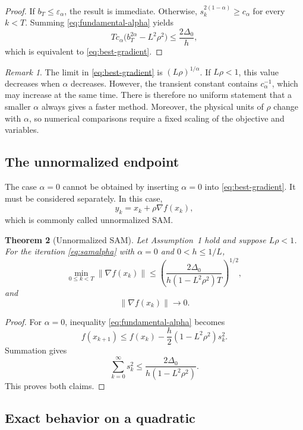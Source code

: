\documentclass[11pt]{article}
\newtheorem{theorem}{Theorem}
\theoremstyle{remark}
\newtheorem{remark}[theorem]{Remark}
\newcommand{\norm}[1]{\left\lVert #1\right\rVert}
\begin{document}
\begin{proof}
If $b_T\leq\varepsilon_\alpha$, the result is immediate.  Otherwise,
$s_k^{2(1-\alpha)}\geq c_\alpha$ for every $k<T$.
Summing \eqref{eq:fundamental-alpha} yields
$$
 Tc_\alpha\bigl(b_T^{2\alpha}-L^2\rho^2\bigr)
 \leq\frac{2\Delta_0}{h},
$$
which is equivalent to \eqref{eq:best-gradient}.
\end{proof}

\begin{remark}\label{rem:alpha-comparison}
The limit in \eqref{eq:best-gradient} is
$(L\rho)^{1/\alpha}$.  If $L\rho<1$, this value decreases when
$\alpha$ decreases.  However, the transient constant contains
$c_\alpha^{-1}$, which may increase at the same time.  There is therefore
no uniform statement that a smaller $\alpha$ always gives a faster method.
Moreover, the physical units of $\rho$ change with $\alpha$, so numerical
comparisons require a fixed scaling of the objective and variables.
\end{remark}

\subsection{The unnormalized endpoint}

The case $\alpha=0$ cannot be obtained by inserting $\alpha=0$ into
\eqref{eq:best-gradient}.  It must be considered separately.  In this case,
$$
  y_k=x_k+\rho\nabla f(x_k),
$$
which is commonly called unnormalized SAM.

\begin{theorem}[Unnormalized SAM]\label{thm:usam}
Let Assumption~1 hold and suppose $L\rho<1$.  For the iteration
\eqref{eq:samalpha} with $\alpha=0$ and $0<h\leq1/L$,
\begin{equation}\label{eq:usam-bound}
 \min_{0\leq k<T}\norm{\nabla f(x_k)}
 \leq
 \left(
 \frac{2\Delta_0}{
 h(1-L^2\rho^2)T}
 \right)^{1/2},
\end{equation}
and
$$
  \norm{\nabla f(x_k)}\longrightarrow0.
$$
\end{theorem}

\begin{proof}
For $\alpha=0$, inequality \eqref{eq:fundamental-alpha} becomes
$$
 f(x_{k+1})\leq f(x_k)
 -\frac h2(1-L^2\rho^2)s_k^2.
$$
Summation gives
$$
 \sum_{k=0}^{\infty}s_k^2
 \leq \frac{2\Delta_0}{h(1-L^2\rho^2)}.
$$
This proves both claims.
\end{proof}

\subsection{Exact behavior on a quadratic}
\end{document}
